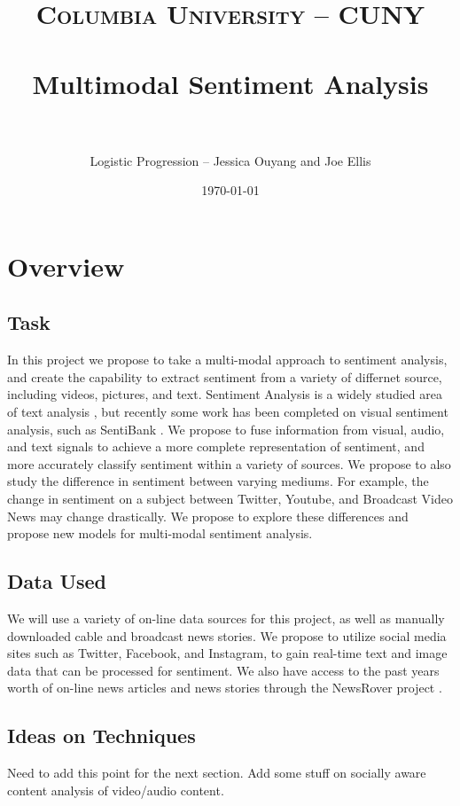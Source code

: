 \documentclass[paper=a4, fontsize=11pt]{scrartcl} %
\title{	
\normalfont \normalsize 
\textsc{Columbia University -- CUNY} \\ [25pt] %
\horrule{0.5pt} \\[0.4cm] %
\huge Multimodal Sentiment Analysis \\ %
\horrule{2pt} \\[0.5cm] %
}
\author{Logistic Progression -- Jessica Ouyang and Joe Ellis} %
\date{\normalsize\today} %
\begin{document}
\maketitle %


\section{Overview}


\subsection{Task}
In this project we propose to take a multi-modal approach to sentiment analysis, and create the capability to extract sentiment from a variety of differnet source, including videos, pictures, and text.
Sentiment Analysis is a widely studied area of text analysis \cite{Pang}, but recently some work has been completed on visual sentiment analysis, such as SentiBank \cite{MM13:sentibank_long}.
We propose to fuse information from visual, audio, and text signals to achieve a more complete representation of sentiment, and more accurately classify sentiment within a variety of sources. 
We propose to also study the difference in sentiment between varying mediums.
For example, the change in sentiment on a subject between Twitter, Youtube, and Broadcast Video News may change drastically.
We propose to explore these differences and propose new models for multi-modal sentiment analysis.


\subsection{Data Used}
We will use a variety of on-line data sources for this project, as well as manually downloaded cable and broadcast news stories. 
We propose to utilize social media sites such as Twitter, Facebook, and Instagram, to gain real-time text and image data that can be processed for sentiment.
We also have access to the past years worth of on-line news articles and news stories through the NewsRover project \cite{MM13:structurednews}.

\subsection{Ideas on Techniques}
{\color{red} Need to add this point for the next section.}
{\color{blue} Add some stuff on socially aware content analysis of video/audio content.}
\end{document}
